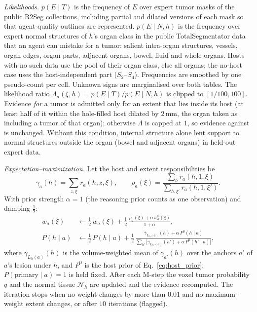 \documentclass[fleqn,10pt]{olplainarticle}
\begin{document}
\emph{Likelihoods.} $p(E\mid T)$ is the frequency of $E$ over expert tumor masks of the public R2Seg collections, including
partial and dilated versions of each mask so that agent-quality outlines are represented. $p(E\mid N,h)$ is the frequency over
expert normal structures of $h$'s organ class in the public TotalSegmentator data that an agent can mistake for a tumor:
salient intra-organ structures, vessels, organ edges, organ parts, adjacent organs, bowel, fluid and whole organs. Hosts with
no such data use the pool of their organ class, else all organs; the no-host case uses the host-independent part
($S_2$--$S_4$). Frequencies are smoothed by one pseudo-count per cell. Unknown signs are marginalised over both tables. The
likelihood ratio $\Lambda_a(\xi,h)=p(E\mid T)/p(E\mid N,h)$ is clipped to $[1/100,100]$. Evidence \emph{for} a tumor is admitted only
for an extent that lies inside its host (at least half of it within the hole-filled host dilated by $2$\,mm, the organ taken as
including a tumor of that organ); otherwise $\Lambda$ is capped at $1$, so evidence against is unchanged. Without this condition,
internal structure alone lent support to normal structures outside the organ (bowel and adjacent organs) in held-out expert
data.

\emph{Expectation--maximization.} Let the host and extent responsibilities be
\begin{equation*}
\gamma_a(h)=\sum_{z,\xi}r_a(h,z,\xi),\qquad
\rho_a(\xi)=\frac{\sum_h r_a(h,1,\xi)}{\sum_{h,\xi'}r_a(h,1,\xi')}.
\end{equation*}
With prior strength $\alpha=1$ (the reasoning prior counts as one observation) and damping $\tfrac12$:
\begin{equation}
\label{eq:mstep}
\begin{aligned}
w_a(\xi)&\leftarrow\tfrac12\,w_a(\xi)+\tfrac12\,\frac{\rho_a(\xi)+\alpha\,w^{0}_a(\xi)}{1+\alpha},\\
P(h\mid a)&\leftarrow\tfrac12\,P(h\mid a)+\tfrac12\,\frac{\bar\gamma_{L_h(a)}(h)+\alpha\,P^{0}(h\mid a)}{\sum_{h'}\bigl[\bar\gamma_{L_{h'}(a)}(h')+\alpha\,P^{0}(h'\mid a)\bigr]},
\end{aligned}
\end{equation}
where $\bar\gamma_{L_h(a)}(h)$ is the volume-weighted mean of $\gamma_{a'}(h)$ over the anchors $a'$ of $a$'s lesion under $h$, and
$P^{0}$ is the host prior of Eq.~\eqref{eq:host_prior}; $P(\text{primary}\mid a)=1$ is held fixed. After each M-step the voxel
tumor probability $q$ and the normal tissue $\mathcal{N}_h$ are updated and the evidence recomputed. The iteration stops when no
weight changes by more than $0.01$ and no maximum-weight extent changes, or after $10$ iterations (flagged).
\end{document}
